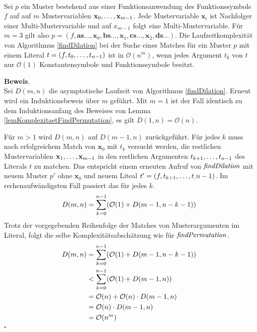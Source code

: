 \begin{lemma}\label{lemKomplexitaetDilation}~\\
Sei $p$ ein Muster bestehend aus einer Funktionsanwendung des Funktionssymbols $f$ auf auf $m$ Mustervariablen ${\mathbf x}_{0}, \dots, {\mathbf x}_{m-1}$. 
Jede Mustervariable $\mathbf x_i$ ist Nachfolger einer Multi-Mustervariable und auf $x_{m-1}$ folgt eine Multi-Mustervariable. Für $m = 3$ gilt also $p = (f, \mathbf{as...}, \mathbf x_0, \mathbf{bs...}, \mathbf x_1, \mathbf{cs...}, \mathbf x_2, \mathbf{ds...})$.
Die Laufzeitkomplexität von Algorithmus \ref{findDilation} bei der Suche eines Matches für ein Muster $p$  mit einem Literal $t = (f, {t}_{0}, \dots, {t}_{n-1})$ ist in $\mathcal O(n^m)$, wenn jedes Argument $t_k$ von $t$ nur $\mathcal O(1)$ Konstantensymbole und Funktionssymbole besitzt.
\end{lemma}

\textbf{Beweis}.\\
Sei $D(m, n)$ die asymptotische Laufzeit von Algorithmus \ref{findDilation}. Erneut wird ein Induktionsbeweis über $m$ geführt.
Mit $m = 1$ ist der Fall identisch zu dem Induktionsanfang des Beweises von Lemma \ref{lemKomplexitaetFindPermutation}, es gilt $D(1, n) = \mathcal O(n)$. 

Für $m > 1$ wird $D(m, n)$ auf $D(m-1, n)$ zurückgeführt. Für jedes $k$ muss nach erfolgreichem Match von $\mathbf x_0$ mit $t_k$ versucht werden, die restlichen Mustervariablen ${\mathbf x}_{1}, \dots, {\mathbf x}_{m-1}$ in den restlichen Argumenten ${t}_{k+1}, \dots, {t}_{n-1}$ des Literals $t$ zu matchen. Das entspricht einem erneuten Aufruf von $\mathit{findDilation}$ mit neuem Muster $p'$ ohne $\mathbf x_0$ und neuem Liteal $t' = (f, {t}_{k+1}, \dots, {t}_{,} {n-1})$.
Im rechenaufwändigsten Fall passiert das für jedes $k$.
$$D(m, n) = \sum_{k = 0}^{n-1} \paren*{\mathcal O(1) + D(m-1, n - k - 1)}$$
Trotz der vorgegebenden Reihenfolge der Matches von Musterargumenten im Literal, folgt die selbe Komplexitätsabschätzung wie für $\mathit{findPermutation}$.
\begin{equation*}
	\begin{split} 
		D(m, n) 
		&= \sum_{k = 0}^{n-1} \paren*{\mathcal O(1) + D(m-1, n - k - 1)}\\ 
		&< \sum_{k = 0}^{n-1} \paren*{\mathcal O(1) + D(m-1, n)}\\
		&= \mathcal O(n) + \mathcal O(n) \cdot D(m-1, n)\\
		&= \mathcal O(n) \cdot D(m-1, n)\\
		&= \mathcal O(n^m)
	\end{split}
\end{equation*}
\hfill $\square$\\


